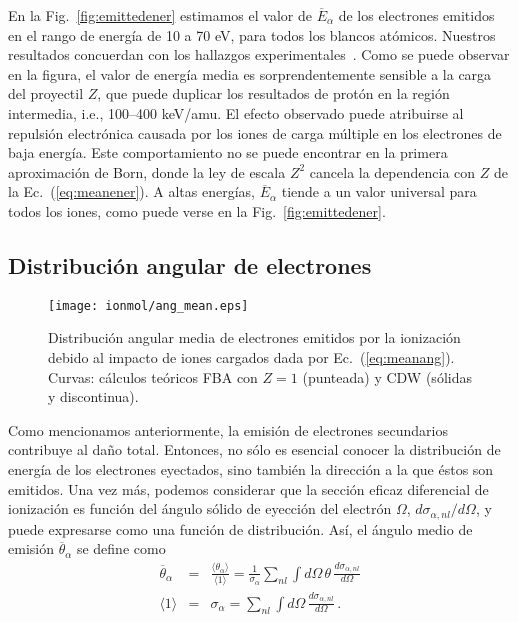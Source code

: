 En la Fig.~\ref{fig:emittedener} estimamos el valor de 
$\overline{E}_{\alpha}$ de los electrones emitidos en el rango de energía 
de 10 a 70 eV, para todos los blancos atómicos. Nuestros resultados 
concuerdan con los hallazgos experimentales~\cite{Surdutovic:18}. Como se 
puede observar en la figura, el valor de energía media es 
sorprendentemente sensible a la carga del proyectil $Z$, que puede 
duplicar los resultados de protón en la región intermedia, i.e., 
100--400 keV/amu. El efecto observado puede atribuirse al repulsión 
electrónica causada por los iones de carga múltiple en los electrones de 
baja energía. Este comportamiento no se puede encontrar en la primera 
aproximación de Born, donde la ley de escala $Z^2$ cancela la dependencia 
con $Z$ de la Ec.~(\ref{eq:meanener}). A altas energías, 
$\overline{E}_{\alpha}$ tiende a un valor universal para todos los iones, 
como puede verse en la Fig.~\ref{fig:emittedener}.

\subsection{Distribución angular de electrones}
\label{subsec:meanang}

\begin{figure}
\centering
\texttt{[image: ionmol/ang\_mean.eps]}
\caption[Distribución angular media de electrones emitidos.]
{Distribución angular media de electrones emitidos por la ionización 
debido al impacto de iones cargados dada por Ec.~(\ref{eq:meanang}). 
Curvas: cálculos teóricos FBA con $Z=1$ (punteada) y CDW (sólidas y 
discontinua).}
\label{fig:emittedang}
\end{figure} 

Como mencionamos anteriormente, la emisión de electrones secundarios 
contribuye al daño total. Entonces, no sólo es esencial conocer la 
distribución de energía de los electrones eyectados, sino también la 
dirección a la que éstos son emitidos. Una vez más, podemos considerar 
que la sección eficaz diferencial de ionización es función del ángulo 
sólido de eyección del electrón $\Omega$, $d\sigma_{\alpha,nl}/d\Omega$, 
y puede expresarse como una función de distribución. Así, el ángulo medio 
de emisión $\overline{\theta}_{\alpha}$ se define como
\begin{eqnarray}
\overline{\theta}_{\alpha}&=&\frac{\langle\theta_{\alpha}\rangle}
{\langle 1\rangle}=\frac{1}{\sigma_{\alpha}}\sum\limits_{nl}
\int d\Omega\,\theta\,\frac{d\sigma_{\alpha,nl}}{d\Omega} 
\label{eq:meanang} \\
\langle 1\rangle &=&\sigma_{\alpha}=\sum\limits_{nl}\int d\Omega\,
\frac{d\sigma_{\alpha,nl}}{d\Omega}\,.
\end{eqnarray}

